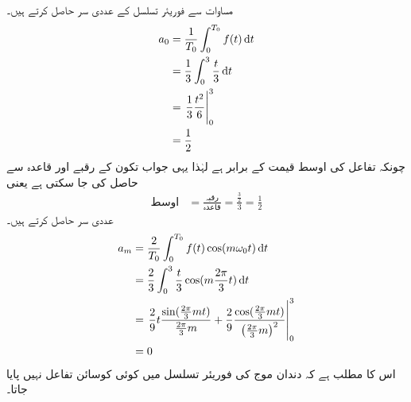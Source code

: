 مساوات  سے فوریئر تسلسل کے عددی سر حاصل کرتے ہیں۔
\begin{align*}
a_0&=\frac{1}{T_0}\int_0^{T_0} f(t) \dif t\\
&=\frac{1}{3}\int_0^3 \frac{t}{3} \dif t\\
&=\left. \frac{1}{3} \frac{t^2}{6} \right|_0^3\\
&=\frac{1}{2}
\end{align*}
چونکہ  تفاعل کی اوسط قیمت کے برابر ہے لہٰذا یہی جواب تکون کے رقبے  اور قاعدہ  سے حاصل کی جا سکتی ہے یعنی
\begin{align*}
\text{اوسط}&=\frac{\text{رقبہ}}{\text{قاعدہ}}=\frac{\frac{3}{2}}{3}=\frac{1}{2}
\end{align*}
عددی سر  حاصل کرتے ہیں۔
\begin{align*}
a_m&=\frac{2}{T_0}\int_0^{T_0} f(t)\cos (m\omega_0 t) \dif t\\
&=\frac{2}{3}\int_0^3 \frac{t}{3} \cos (m \frac{2\pi}{3} t) \dif t\\
&=\left. \frac{2}{9}t \frac{\sin(\frac{2\pi}{3}mt)}{\frac{2\pi}{3}m}+\frac{2}{9}\frac{\cos(\frac{2\pi}{3}mt)}{\left(\frac{2\pi}{3}m\right)^2}\right|_0^3\\
&=0
\end{align*}
اس کا مطلب ہے کہ دندان موج کی فوریئر تسلسل میں کوئی کوسائن تفاعل نہیں پایا جاتا۔

